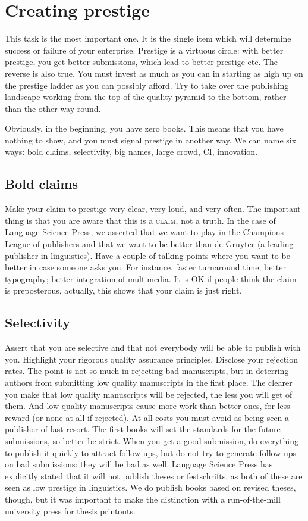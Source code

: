 \documentclass[guidelines,nonflat,modfonts] {langsci/langscibook}
\begin{document}
\section{Creating prestige}
This task is the most important one. It is the single item which will determine success or failure of your enterprise. 
Prestige is a virtuous circle: with better prestige, you get better submissions, which lead to better prestige etc. The reverse is also true. You must invest as much as you can in starting as high up on the prestige ladder as you can possibly afford. Try to take over the publishing landscape working from the top of the quality pyramid to the bottom, rather than the other way round.

Obviously, in the beginning, you have zero books. This means that you have nothing to show, and you must signal prestige in another way. We can name six ways: %
bold claims, 
selectivity, 
big names, 
large crowd, 
CI, 
innovation. 

\subsection{Bold claims}
Make your claim to prestige very clear, very loud, and very often. The important thing is that you are aware that this is a \textsc{claim}, not a truth. In the case of Language Science Press, we asserted that we want to play in the Champions League of publishers and that we want to be better than de Gruyter (a leading publisher in linguistics). Have a couple of talking points where you want to be better in case someone asks you. For instance, faster turnaround time; better typography; better integration of multimedia. It is OK if people think the claim is preposterous, actually, this shows that your claim is just right. 

\subsection{Selectivity}
Assert that you are selective and that not everybody will be able to publish with you. Highlight your rigorous quality assurance principles. Disclose your rejection rates. The point is not so much in rejecting bad manuscripts, but in deterring authors from submitting low quality manuscripts in the first place. The clearer you make that low quality manuscripts will be rejected, the less you will get of them. And low quality manuscripts cause more work than better ones, for less reward (or none at all if rejected). 
At all costs you must avoid as being seen a publisher of last resort. The first books will set the standards for the future submissions, so better be strict. When you get a good submission, do everything to publish it quickly to attract follow-ups, but do not try to generate follow-ups on bad submissions: they will be bad as well. 
Language Science Press has explicitly stated that it will not publish theses or festschrifts, as both of these are seen as low prestige in linguistics. We do publish books based on revised theses, though, but it was important to make the distinction with a run-of-the-mill university press for thesis printouts.
\end{document}
